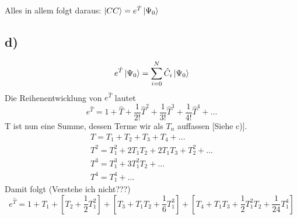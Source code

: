 Alles in allem folgt daraus: $\Ket{CC} =  e^{\hat{T}} \Ket{\Psi_0}$

\subsection{d)}

\begin{equation}
e^{\hat{T}} \Ket{\Psi_0} = \sum_{i=0}^N \hat{C}_i \Ket{\Psi_0}
\end{equation}
Die Reihenentwicklung von $e^{\hat{T}}$ lautet
\begin{equation}
e^{\hat{T}} = 1 + \hat{T} + \frac{1}{2!}\hat{T}^2 + \frac{1}{3!}\hat{T}^3 + \frac{1}{4!}\hat{T}^4 + ...
\end{equation}
T ist nun eine Summe, dessen Terme wir als $T_n$ auffassen [Siehe c)].
\begin{align}
T = T_1 + T_2 + T_3 + T_4 + ... \\
T^2 = T_1^2 + 2T_1T_2 + 2T_1T_3 + T_2^2 + ... \\
T^3 = T_1^3 + 3T_1^2T_2 + ... \\
T^4 = T_1^4 + ...
\end{align}
Damit folgt (Verstehe ich nicht???)
\begin{equation}
e^{\hat{T}} = 1 + T_1 + \left[ T_2 + \frac{1}{2} T_1^2 \right] + \left[ T_3 + T_1T_2 + \frac{1}{6} T_1^3 \right]
+ \left[ T_4 + T_1T_3 + \frac{1}{2} T_1^2T_2 +\frac{1}{24}T_1^4 \right]
\end{equation}
